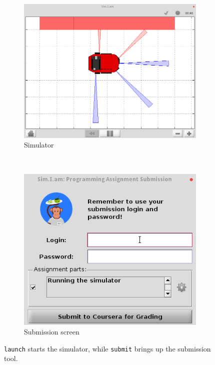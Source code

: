 \documentclass[10pt]{article}
\begin{document}
\begin{figure}[h]
  \centering
  \begin{subfigure}{0.45\textwidth}
    \includegraphics[width=\textwidth]{images/simiam-quickbot.png}
    \caption{Simulator}
    \label{fig:simulator}
  \end{subfigure}
  $\qquad$
  \begin{subfigure}{0.4\textwidth}
    \includegraphics[width=\textwidth]{images/simiam-submit.png}
    \caption{Submission screen}
    \label{fig:submission}
  \end{subfigure}
  \caption{\texttt{launch} starts the simulator, while \texttt{submit} brings up the submission tool.}
  \label{fig:screens}
\end{figure}
\end{document}
